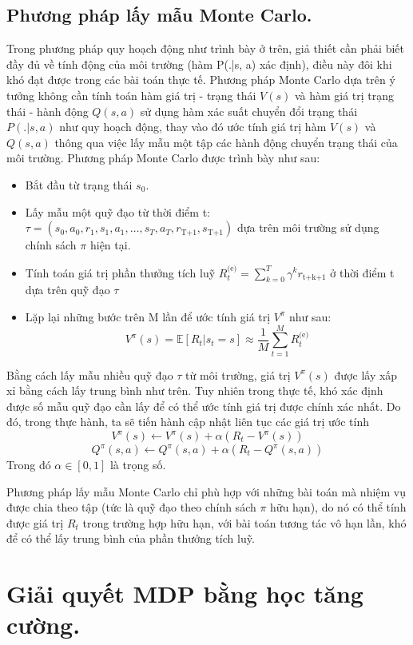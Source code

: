 \documentclass{uetgraduation}
\begin{document}
\subsection{Phương pháp lấy mẫu Monte Carlo.}
Trong phương pháp quy hoạch động như trình bày ở trên, giả thiết cần phải biết đầy đủ về tính động của môi trường (hàm P(.|s, a) xác định), điều này đôi khi khó đạt được
trong các bài toán thực tế. Phương pháp Monte Carlo dựa trên ý tưởng không cần tính toán hàm giá trị - trạng thái $V(s)$ và hàm giá trị trạng thái - hành động
$Q(s,a)$ sử dụng hàm xác suất chuyển đổi trạng thái $P(.|s, a)$ như quy hoạch động, thay vào đó ước tính giá trị hàm $V(s)$ và $Q(s,a)$ thông qua việc lấy mẫu
một tập các hành động chuyển trạng thái của môi trường. Phương pháp Monte Carlo được trình bày như sau:
\begin{itemize}
    \item Bắt đầu từ trạng thái $s_0$.
    \item Lấy mẫu một quỹ đạo từ thời điểm t: $\tau = (s_0, a_0, r_1, s_1, a_1, \dots, s_T, a_T, r_\text{T+1}, s_\text{T+1})$ dựa trên môi trường sử dụng chính
    sách $\pi$ hiện tại.
    \item Tính toán giá trị phần thưởng tích luỹ $R_t^\text{(e)} = \sum_{k=0}^{T} \gamma^k r_\text{t+k+1}$ ở thời điểm t dựa trên quỹ đạo $\tau$
    \item Lặp lại những bước trên M lần để ước tính giá trị $V^\pi$ như sau:
    \[
    V^\pi (s) = \mathbb{E} [R_t | s_t = s] \approx \frac{1}{M} \sum_{t=1}^{M} R_t^\text{(e)}
    \]
\end{itemize}

Bằng cách lấy mẫu nhiều quỹ đạo $\tau$ từ môi trường, giá trị $V^\pi (s)$ được lấy xấp xỉ bằng cách lấy trung bình như trên. Tuy nhiên trong thực tế, khó xác
định được số mẫu quỹ đạo cần lấy để có thể ước tính giá trị được chính xác nhất. Do đó, trong thực hành, ta sẽ tiến hành cập nhật liên tục các giá trị ước tính
\[
V^\pi (s) \leftarrow V^\pi (s) + \alpha (R_t - V^\pi (s))
\]
\[
Q^\pi (s, a) \leftarrow Q^\pi (s, a) + \alpha (R_t - Q^\pi (s, a))
\]
Trong đó $\alpha \in [0, 1]$ là trọng số.

Phương pháp lấy mẫu Monte Carlo chỉ phù hợp với những bài toán mà nhiệm vụ được chia theo tập (tức là quỹ đạo theo chính sách $\pi$ hữu hạn), do nó có thể tính
được giá trị $R_t$ trong trường hợp hữu hạn, với bài toán tương tác vô hạn lần, khó để có thể lấy trung bình của phần thưởng tích luỹ.

\section{Giải quyết MDP bằng học tăng cường.}
\end{document}
